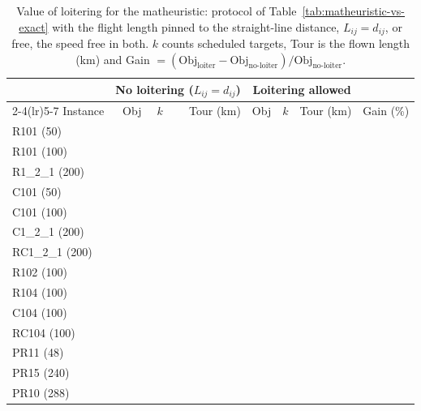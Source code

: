 \documentclass[11pt]{article}
\begin{document}
\begin{table}[H]
\centering\small
\setlength{\tabcolsep}{5pt}
\caption{Value of loitering for the matheuristic: protocol of Table~\ref{tab:matheuristic-vs-exact} with the flight length pinned to the straight-line distance, $L_{ij} = d_{ij}$, or free, the speed free in both. $k$ counts scheduled targets, Tour is the flown length (km) and Gain $= (\text{Obj}_{\text{loiter}} - \text{Obj}_{\text{no-loiter}})/\text{Obj}_{\text{no-loiter}}$.}\label{tab:coverage}
\begin{tabular}{l rrr rrr r}
\toprule
& \multicolumn{3}{c}{No loitering ($L_{ij} = d_{ij}$)} & \multicolumn{3}{c}{Loitering allowed} & \\
\cmidrule(lr){2-4}\cmidrule(lr){5-7}
Instance & Obj & $k$ & Tour (km) & Obj & $k$ & Tour (km) & Gain (\%) \\
\midrule
R101 (50) & & & & & & & \\
R101 (100) & & & & & & & \\
R1\_2\_1 (200) & & & & & & & \\
\midrule
C101 (50) & & & & & & & \\
C101 (100) & & & & & & & \\
C1\_2\_1 (200) & & & & & & & \\
\midrule
RC1\_2\_1 (200) & & & & & & & \\
\midrule
R102 (100) & & & & & & & \\
R104 (100) & & & & & & & \\
C104 (100) & & & & & & & \\
RC104 (100) & & & & & & & \\
\midrule
PR11 (48) & & & & & & & \\
PR15 (240) & & & & & & & \\
PR10 (288) & & & & & & & \\
\bottomrule
\end{tabular}
\end{table}
\end{document}

